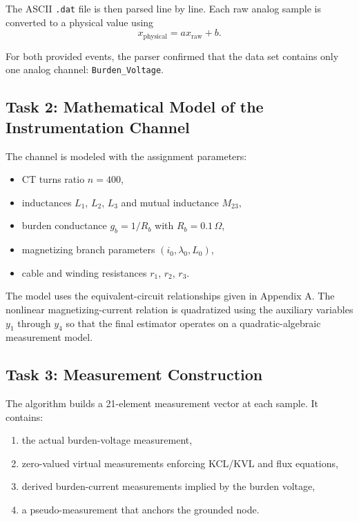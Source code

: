\documentclass[11pt]{article}
\begin{document}
The ASCII \texttt{.dat} file is then parsed line by line. Each raw analog sample is converted to a
physical value using
\begin{equation}
x_{\text{physical}} = a x_{\text{raw}} + b.
\end{equation}

For both provided events, the parser confirmed that the data set contains only one analog channel:
\texttt{Burden\_Voltage}.

\subsection{Task 2: Mathematical Model of the Instrumentation Channel}
The channel is modeled with the assignment parameters:
\begin{itemize}
  \item CT turns ratio $n = 400$,
  \item inductances $L_1$, $L_2$, $L_3$ and mutual inductance $M_{23}$,
  \item burden conductance $g_b = 1/R_b$ with $R_b = 0.1 \, \Omega$,
  \item magnetizing branch parameters $(i_0, \lambda_0, L_0)$,
  \item cable and winding resistances $r_1$, $r_2$, $r_3$.
\end{itemize}

The model uses the equivalent-circuit relationships given in Appendix A. The nonlinear
magnetizing-current relation is quadratized using the auxiliary variables $y_1$ through $y_4$ so
that the final estimator operates on a quadratic-algebraic measurement model.

\subsection{Task 3: Measurement Construction}
The algorithm builds a 21-element measurement vector at each sample. It contains:
\begin{enumerate}[label=\alph*)]
  \item the actual burden-voltage measurement,
  \item zero-valued virtual measurements enforcing KCL/KVL and flux equations,
  \item derived burden-current measurements implied by the burden voltage,
  \item a pseudo-measurement that anchors the grounded node.
\end{enumerate}
\end{document}
